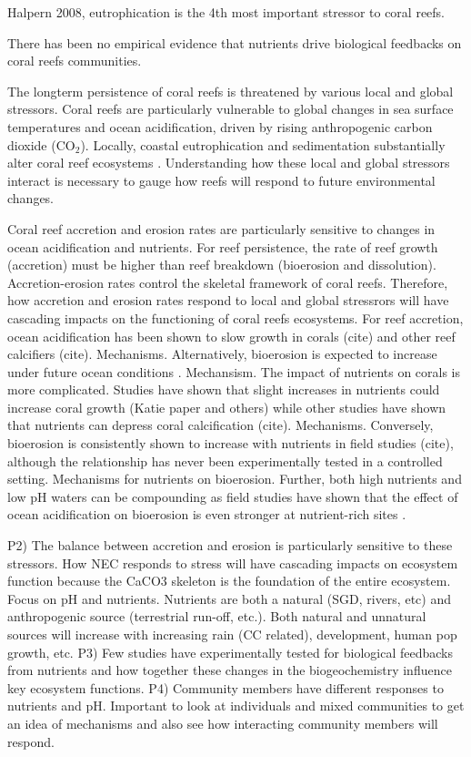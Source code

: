 \documentclass{article}%
\begin{document}
Halpern 2008, eutrophication is the 4th most important stressor to coral reefs. 

There has been no empirical evidence that nutrients drive biological feedbacks on coral reefs communities. 

The longterm persistence of coral reefs is threatened by various local and global stressors. Coral reefs are particularly vulnerable to global changes in sea surface temperatures and ocean acidification, driven by rising anthropogenic carbon dioxide (CO$_2$)\cite{Hoegh-Guldberg2007,pandolfi2011projecting}. Locally, coastal eutrophication and sedimentation substantially alter coral reef ecosystems \cite{fabricius2005effects,rogers1990responses}. Understanding how these local and global stressors interact is necessary to gauge how reefs will respond to future environmental changes. 

Coral reef accretion and erosion rates are particularly sensitive to changes in ocean acidification and nutrients. For reef persistence, the rate of reef growth (accretion) must be higher than reef breakdown (bioerosion and dissolution). Accretion-erosion rates control the skeletal framework of coral reefs. Therefore, how accretion and erosion rates respond to local and global stressrors will have cascading impacts on the functioning of coral reefs ecosystems. For reef accretion, ocean acidification has been shown to slow growth in corals (cite) and other reef calcifiers (cite).  Mechanisms. Alternatively, bioerosion is expected to increase under future ocean conditions \cite{Tribollet2009, Wisshak2012, silbiger2014reefs, silbiger2014secondary, silbiger2016novel,schonberg2017bioerosion}. Mechansism. The impact of nutrients on corals is more complicated.  Studies have shown that slight increases in nutrients could increase coral growth (Katie paper and others) while other studies have shown that nutrients can depress coral calcification (cite). Mechanisms. Conversely, bioerosion is consistently shown to increase with nutrients in field studies (cite), although the relationship has never been experimentally tested in a controlled setting.  Mechanisms for nutrients on bioerosion.  Further, both high nutrients and low pH waters can be compounding as field studies have shown that the effect of ocean acidification on bioerosion is even stronger at nutrient-rich sites \cite{decarlo2014coral}.

P2) The balance between accretion and erosion is particularly sensitive to these stressors. How NEC responds to stress will have cascading impacts on ecosystem function because the CaCO3 skeleton is the foundation of the entire ecosystem. Focus on pH and nutrients. Nutrients are both a natural (SGD, rivers, etc) and anthropogenic source (terrestrial run-off, etc.). Both natural and unnatural sources will increase with increasing rain (CC related), development, human pop growth, etc. 
P3) Few studies have experimentally tested for biological feedbacks from nutrients and how together these changes in the biogeochemistry influence key ecosystem functions.
P4) Community members have different responses to nutrients and pH. Important to look at individuals and mixed communities to get an idea of mechanisms and also see how interacting community members will respond.
\end{document}
